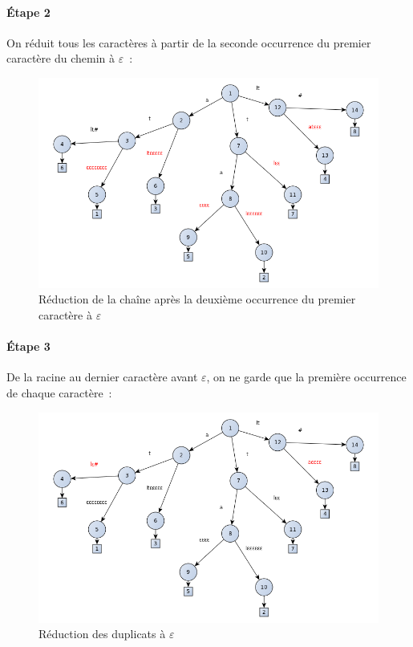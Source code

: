 \documentclass[a4paper]{article}
\begin{document}
\paragraph{Étape 2} On réduit tous les caractères à partir de la seconde occurrence du premier caractère du chemin à $\varepsilon$~:

\begin{figure}[H]
\centering
\includegraphics[width=\textwidth]{./slides/img/construction-1.png}
\caption{Réduction de la chaîne après la deuxième occurrence du
  premier caractère à $\varepsilon$}
\label{overflow}
\end{figure}

\paragraph{Étape 3} De la racine au dernier caractère avant
$\varepsilon$, on ne garde que la première occurrence de chaque
caractère~:

\begin{figure}[H]
\centering
\includegraphics[width=\textwidth]{./slides/img/construction-2.png}
\caption{Réduction des duplicats à $\varepsilon$}
\label{overflow}
\end{figure}
\end{document}
